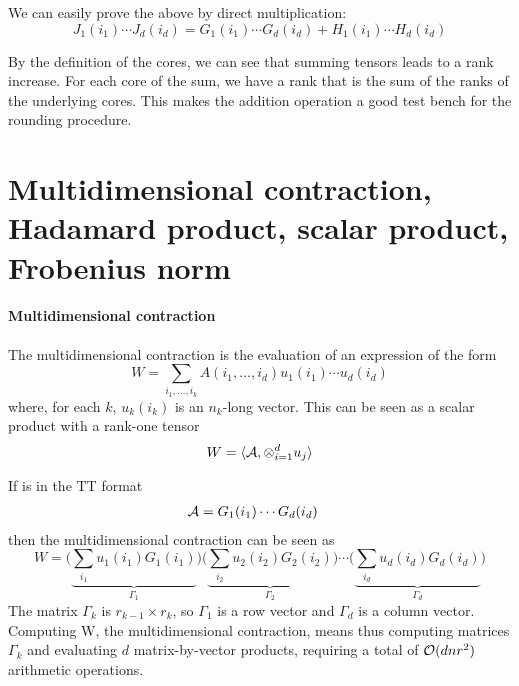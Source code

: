 We can easily prove the above by direct multiplication:
\begin{equation*}
  J_1(i_1) \cdots J_d(i_d) = G_1(i_1) \cdots G_d(i_d) + H_1(i_1) \cdots H_d(i_d)
\end{equation*}

By the definition of the cores, we can see that summing tensors leads to a rank increase. For each core of the sum, we have a rank that is the sum of the ranks of the underlying cores. This makes the addition operation a good test bench for the rounding procedure.

\section{Multidimensional contraction, Hadamard product, scalar product, Frobenius norm}
\paragraph{Multidimensional contraction}
The multidimensional contraction is the evaluation of an expression of the form
\begin{equation*}
  W = \sum_{i_1,\ldots,i_k} A(i_1,\ldots,i_d) u_1(i_1) \cdots u_d(i_d)
\end{equation*}
where, for each $k$, $u_k(i_k)$ is an $n_k$-long vector. This can be seen as a scalar product with a rank-one tensor
\begin{equation*}
  W = \langle \mathcal{A}, \otimes_{i=1}^d u_j \rangle
\end{equation*}

If \A is in the TT format
\begin{equation*}
  \begin{split}
    \mathcal{A} &= G_1(i_1) \cdots G_d(i_d)
  \end{split}
\end{equation*}
then the multidimensional contraction can be seen as
\begin{equation*}
  W = \Bigg( \underbrace{\sum_{i_1} u_1(i_1)G_1(i_1)}_{\Gamma_1} \Bigg) \Bigg( \underbrace{ \sum_{i_2} u_2(i_2)G_2(i_2)}_{\Gamma_2} \Bigg) \cdots \Bigg( \underbrace{\sum_{i_d} u_d(i_d)G_d(i_d)}_{\Gamma_d} \Bigg)
\end{equation*}
The matrix $\Gamma_k$ is $r_{k-1} \times r_k$, so $\Gamma_1$ is a row vector and $\Gamma_d$ is a column vector. Computing W, the multidimensional contraction, means thus computing matrices $\Gamma_k$ and evaluating $d$ matrix-by-vector products, requiring a total of $\mathcal{O}(dnr^2)$ arithmetic operations.

